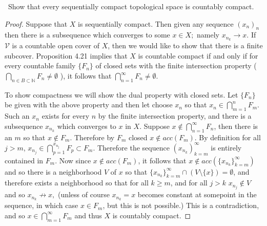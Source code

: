 \documentclass[11pt]{amsart}
\theoremstyle{definition}
\numberwithin{theorem}{section}
\numberwithin{definition}{section}
\numberwithin{equation}{section}
\def\scriptv{{\mathcal V}}
\begin{document}
\medskip {}\ Show that every sequentially compact topological space is countably compact.
\begin{proof}
	Suppose that $X$ is sequentially compact. Then given any sequence $(x_n)_n$ then there is a subsequence which converges to some $x \in X;$ namely $x_{n_k} \to x.$ If $\scriptv$ is a countable open cover of $X$, then we would like to show that there is a finite subcover. Proposition 4.21 implies that $X$ is countable compact if and only if for every countable family $\{F_n\}$ of
	closed sets with the finite intersection property ($\bigcap_{n\in B\subset\mathbb{N}} F_n \neq \emptyset$ ), it follows that
$\bigcap_{n=1}^\infty F_n \neq \emptyset.$

	To show compactness we will show the dual property with closed sets. Let $\{F_n\}$ be given with the above property and then let choose $x_n$ so that $x_n \in \bigcap_{m=1}^n F_m.$ Such an $x_n$ exists for every $n$ by the finite intersection property, and there is a subsequence $x_{n_k}$ which converges to $x$ in $X$. Suppose $x \not\in \bigcap_{n=1}^\infty F_n$, then there is an $m$ so that $x \not\in F_m$. Therefore by $F_m$ closed $x \not\in acc(F_m).$ By definition for all $j >m$, $x_{n_j} \in \bigcap_{p=1}^{x_{n_j}} F_p \subset F_m$. Therefore the sequence $(x_{n_k})_{k=m}^\infty$ is entirely contained in $F_m$.
	Now since $x \notin acc(F_m)$, it follows that $x \notin acc\left(\{x_{n_k}\}_{k=m}^\infty\right)$ and so
	there is a neighborhood $V$ of $x$ so that $\{x_{n_k}\}_{k=m}^\infty \cap (V \setminus \{x\}) = \emptyset$, 
	and therefore exists a neighborhood so that for all $k \geq m$, and for all $j > k$ $x_{n_j} \notin V$ and so $x_{n_k} \not\to x,$ (unless of course $x_{n_k} = x$ becomes constant at somepoint in the sequence, in which case $x \in F_m$, but this is not possible.) This is a contradiction, and so $x \in \bigcap_{m=1}^\infty F_m$ and thus $X$ is countably compact.
\end{proof}
\end{document}
